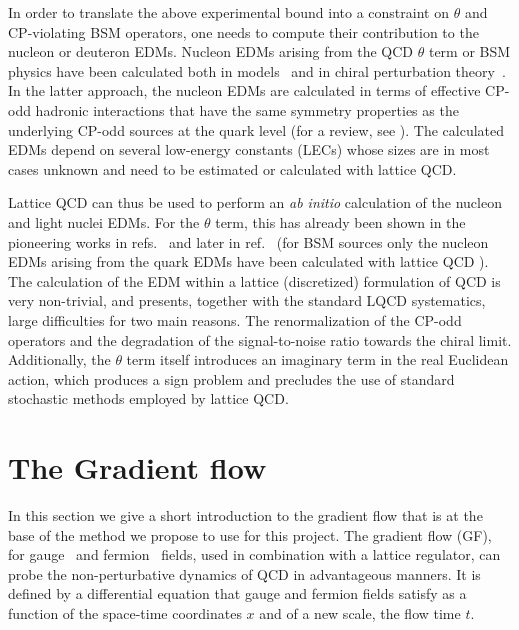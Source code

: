 \documentclass[aps,prc,twocolumn,showpacs,floatfix,nofootinbib,preprintnumbers,superscriptaddress,amsmath,amssymb]{revtex4-1}
\begin{document}
In order to translate the above experimental bound into a constraint on
$\theta$ and CP-violating BSM operators, one needs to compute their contribution to 
the nucleon or deuteron EDMs.
Nucleon EDMs arising from the QCD $\theta$ term or BSM physics have been calculated both in 
models~\cite{Pospelov:2005pr} and in chiral perturbation theory~\cite{Ottnad:2009jw,Mereghetti:2010kp}. 
In the latter approach, the nucleon EDMs are calculated 
in terms of effective CP-odd hadronic interactions that have the same symmetry properties 
as the underlying CP-odd sources at the quark level (for a review, see \cite{Mereghetti:2015rra}). 
The calculated EDMs depend on several low-energy constants (LECs) whose sizes are in most 
cases unknown and need to be estimated or calculated with lattice QCD.
 
Lattice QCD can thus be used to perform an {\it ab initio} calculation of the nucleon 
and light nuclei EDMs.
For the $\theta$ term, this has already been shown in the pioneering works 
in refs.~\cite{Shintani:2005xg,Berruto:2005hg} and later in ref.~\cite{Shintani:2008nt,Aoki:2008gv} 
(for BSM sources only the nucleon EDMs arising from the quark EDMs have been calculated 
with lattice QCD \cite{Bhattacharya:2015esa}).
The calculation of the EDM within a lattice (discretized) formulation of QCD 
is very non-trivial, and presents, together with the standard LQCD systematics, large difficulties for two main reasons. 
The renormalization of the CP-odd operators and the degradation of the signal-to-noise ratio towards the chiral limit.
Additionally, the $\theta$ term itself introduces an imaginary term in the real Euclidean action,
which produces a sign problem and precludes the use of standard stochastic methods employed by lattice QCD.  

\section*{The Gradient flow}

In this section we give a short introduction to the gradient flow that is at the base of the
method we propose to use for this project.
The gradient flow (GF), for gauge~\cite{Luscher:2010iy} 
and fermion~\cite{Luscher:2013cpa} fields, used in combination with a lattice regulator, 
can probe the non-perturbative dynamics of QCD
in advantageous manners.
It is defined by a differential equation that gauge and fermion
fields satisfy as a function of the space-time coordinates $x$ and of a new
scale, the flow time $t$.
\end{document}
